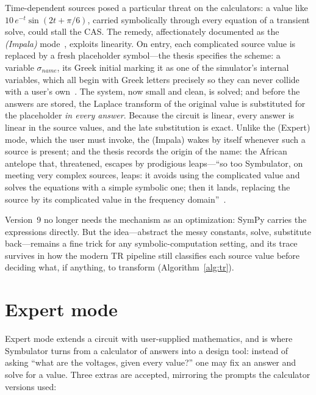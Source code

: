 \documentclass[11pt,oneside]{report}
\begin{document}
Time-dependent sources posed a particular threat on the calculators: a
value like $10\,e^{-t}\sin(2t + \pi/6)$, carried symbolically through
every equation of a transient solve, could stall the CAS. The remedy,
affectionately documented as the \emph{(Impala)}
mode~\cite[\S11.11]{thesis2000}, exploits linearity. On entry, each
complicated source value is replaced by a fresh placeholder
symbol---the thesis specifies the scheme: a variable
$\sigma_{\mathit{name}}$, its Greek initial marking it as one of the
simulator's internal variables, which all begin with Greek letters
precisely so they can never collide with a user's
own~\cite[\S1.8.4]{thesis2000}. The system, now small and clean, is
solved; and before the answers are stored, the Laplace transform of
the original value is substituted for the placeholder \emph{in every
answer}. Because the circuit is linear, every answer is linear in
the source values, and the late substitution is exact. Unlike the
(Expert) mode, which the user must invoke, the (Impala) wakes by
itself whenever such a source is present; and the thesis records the
origin of the name: the African antelope that, threatened, escapes
by prodigious leaps---``so too Symbulator, on meeting very complex
sources, leaps: it avoids using the complicated value and solves the
equations with a simple symbolic one; then it lands, replacing the
source by its complicated value in the frequency
domain''~\cite[\S11.11]{thesis2000}.

Version~9 no longer needs the mechanism as an optimization: SymPy
carries the expressions directly. But the idea---abstract the messy
constants, solve, substitute back---remains a fine trick for any
symbolic-computation setting, and its trace survives in how the modern
TR pipeline still classifies each source value before deciding what,
if anything, to transform (Algorithm~\ref{alg:tr}).

\section{Expert mode}
\label{sec:expert}

Expert mode extends a circuit with user-supplied mathematics, and is
where Symbulator turns from a calculator of answers into a design
tool: instead of asking ``what are the voltages, given every value?''
one may fix an answer and solve for a value. Three extras are
accepted, mirroring the prompts the calculator versions used:
\end{document}
